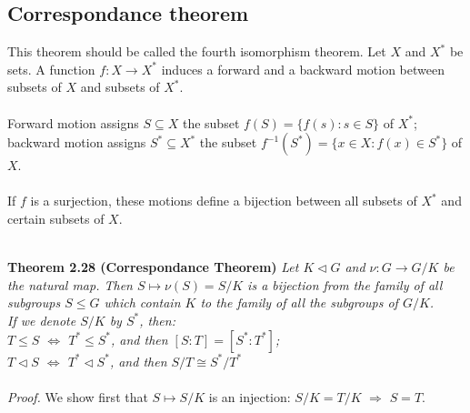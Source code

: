 \documentclass{article}
\begin{document}
\subsection{Correspondance theorem}
This theorem should be called the fourth isomorphism theorem. Let \(X\) and \(X^{*}\) be sets. A function \(f:X\to X^{*}\) induces a forward and a backward motion between subsets of \(X\) and subsets of \(X^{*}\). \\\\
Forward motion assigns \(S\subseteq X\) the subset \(f(S)=\{f(s):s\in S\}\) of \(X^{*}\); backward motion assigns \(S^{*}\subseteq X^{*}\) the subset \(f^{-1}(S^{*})=\{x\in X:f(x)\in S^{*}\}\) of \(X\).\\\\
If \(f\) is a surjection, these motions define a bijection between all subsets of \(X^{*}\) and certain subsets of \(X\).\\\\
\begin{redrules}\color{red}
\textbf{Theorem 2.28 (Correspondance Theorem)} \textit{Let \(K\vartriangleleft G\) and \(\nu:G\to G/K\) be the natural map. Then \(S\mapsto\nu(S)=S/K\) 
is a bijection from the family of all subgroups \(S\le G\) which contain \(K\) to the family of all the subgroups of \(G/K\).\\
If we denote \(S/K\) by \(S^{*}\), then:\\
\(T\le S\) \(\Longleftrightarrow\) \(T^{*}\le S^{*}\), and then \([S:T]=[S^{*}:T^{*}]\);\\
\(T\vartriangleleft S\) \(\Longleftrightarrow\) \(T^{*}\vartriangleleft S^{*}\), and then \(S/T\cong S^{*}/T^{*}\)}\\\\\color{black}
\textit{Proof.} We show first that \(S\mapsto S/K\) is an injection: \(S/K=T/K\) \(\Longrightarrow\) \(S=T\).
\end{redrules}
\end{document}
